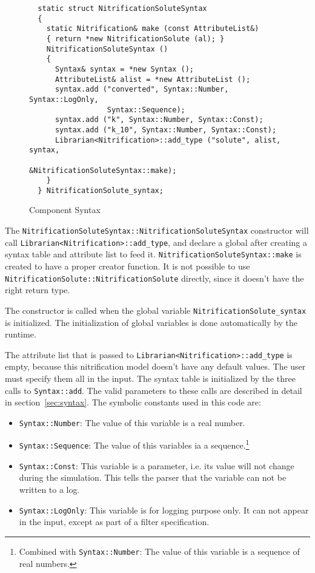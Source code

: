 \documentclass{article}
\newcommand{\cplusplus}%
{{\leavevmode{\rm{\hbox{C\hskip -0.1ex\raise 0.5ex\hbox{\tiny ++}}}}}}
\newcommand{\code}[1]{\texttt{#1}}
\begin{document}
\begin{figure}[htbp]
\begin{verbatim}
  static struct NitrificationSoluteSyntax
  {
    static Nitrification& make (const AttributeList&)
    { return *new NitrificationSolute (al); }
    NitrificationSoluteSyntax ()
    {
      Syntax& syntax = *new Syntax ();
      AttributeList& alist = *new AttributeList ();
      syntax.add ("converted", Syntax::Number, Syntax::LogOnly, 
                  Syntax::Sequence);
      syntax.add ("k", Syntax::Number, Syntax::Const);
      syntax.add ("k_10", Syntax::Number, Syntax::Const);
      Librarian<Nitrification>::add_type ("solute", alist, syntax,
                                          &NitrificationSoluteSyntax::make);
    }
  } NitrificationSolute_syntax;
\end{verbatim}
  \caption{Component Syntax}
  \label{fig:component-syntax}
\end{figure}

The \code{NitrificationSoluteSyntax::NitrificationSoluteSyntax}
constructor will call \code{Librarian<Nitrification>::add\_type}, and
declare a global after creating a syntax table and attribute list to
feed it.  \code{Nitrification\-Solute\-Syntax::make} is created to have a
proper creator function.  It is not possible to use
\code{Nitrification\-Solute::Nitrification\-Solute} directly, since it
doesn't have the right return type.

The constructor is called when the global variable
\code{Nitrification\-Solute\_syn\-tax} is initialized.  The initialization
of global variables is done automatically by the \cplusplus{}
runtime.  

The attribute list that is passed to
\code{Librarian<Nitrification>::add\_type} is empty, because this
nitrification model doesn't have any default values.  The user must
specify them all in the input.  The syntax table is initialized by the
three calls to \code{Syntax::add}.  The valid parameters to these
calls are described in detail in section~\ref{sec:syntax}.
The symbolic constants used in this code are:
\begin{itemize}
\item \code{Syntax::Number}: The value of this variable is a real
  number.
\item \code{Syntax::Sequence}: The value of this variables ia a
  sequence.\footnote{Combined with \code{Syntax::Number}: The value of
  this variable is a sequence of real numbers.}
\item \code{Syntax::Const}: This variable is a parameter, i.e. its
  value will not change during the simulation.  This tells the parser
  that the variable can not be written to a log.
\item \code{Syntax::LogOnly}: This variable is for logging purpose
  only.  It can not appear in the input, except as part of a filter
  specification. 
\end{itemize}
\end{document}
